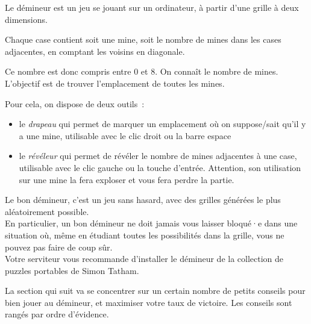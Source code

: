 



Le démineur est un jeu se jouant sur un ordinateur, à partir d'une grille à deux dimensions. 

Chaque case contient soit une mine, soit le nombre de mines dans les cases adjacentes, en comptant les voisins en
diagonale. 

Ce nombre est donc compris entre $0$ et $8$. On connaît le nombre de mines. \\

L'objectif est de trouver l'emplacement de toutes les mines. 

Pour cela, on dispose de deux outils~:

\begin{itemize}

    \item le \emph{drapeau} qui permet de marquer un emplacement où on suppose/sait qu'il y a une mine, utilisable avec
le clic droit ou la barre espace

    \item le \emph{révéleur} qui permet de révéler le nombre de mines adjacentes à une case, utilisable avec le clic
gauche ou la touche d'entrée. Attention, son utilisation sur une mine la fera exploser et vous fera perdre la partie.

\end{itemize}




Le bon démineur, c'est un jeu sans hasard, avec des grilles générées le plus aléatoirement possible.\\

En particulier, un bon démineur ne doit jamais vous laisser bloqué·e dans une situation où, même en étudiant toutes les
possibilités dans la grille, vous ne pouvez pas faire de coup sûr. \\

Votre serviteur vous recommande d'installer le démineur de la collection de puzzles portables de Simon Tatham. 



La section qui suit va se concentrer sur un certain nombre de petits conseils pour bien jouer au démineur, et maximiser
votre taux de victoire. Les conseils sont rangés par ordre d'évidence.

